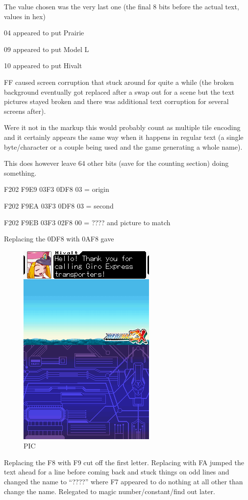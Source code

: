 \documentclass[
]{book}
\begin{document}
The value chosen was the very last one (the final 8 bits before the actual text, values in hex)

04 appeared to put Prairie

09 appeared to put Model L

10 appeared to put Hivalt

FF caused screen corruption that stuck around for quite a while (the broken background eventually got replaced after a swap out for a scene but the text pictures stayed broken and there was additional text corruption for several screens after).

Were it not in the markup this would probably count as multiple tile encoding and it certainly appears the same way when it happens in regular text (a single byte/character or a couple being used and the game generating a whole name).

This does however leave 64 other bits (save for the counting section) doing something.

F202 F9E9 03F3 0DF8 03 = origin

F202 F9EA 03F3 0DF8 03 = second

F202 F9EB 03F3 02F8 00 = ???? and picture to match

Replacing the 0DF8 with 0AF8 gave

\begin{figure}
\centering
\includegraphics{images/108_home_fast6191_romhackingguide_unrenamed_fil___iginal_borders_romhackingguidemarkupexedit3.png}
\caption{PIC}
\end{figure}

Replacing the F8 with F9 cut off the first letter. Replacing with FA jumped the text ahead for a line before coming back and stuck things on odd lines and changed the name to ``????'' where F7 appeared to do nothing at all other than change the name. Relegated to magic number/constant/find out later.
\end{document}
